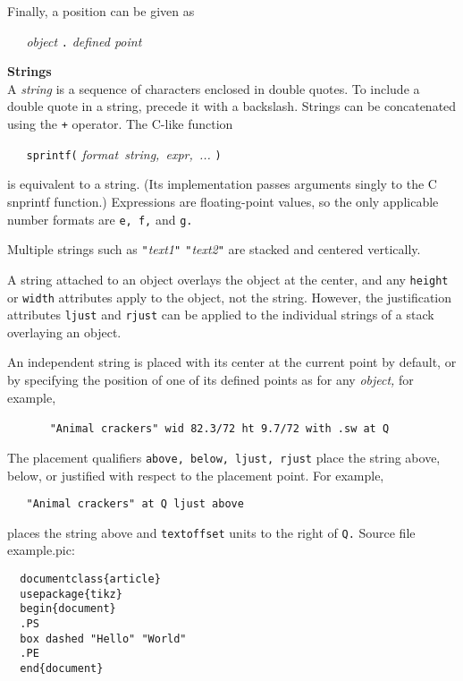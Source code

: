 Finally, a position can be given as

{\it \ \ \ object}
{\tt .}
{\it defined point}
\par\hskip-2pc{\bf Strings}\\
A
{\it string}
is a sequence of characters enclosed in double quotes.
To include a double quote in a string, precede it with a backslash. Strings
can be concatenated using the
{\tt +}
operator.
The C-like function

{\tt \ \ \ sprintf(}
{\it format\ string,\ expr,\ ...}
{\tt )}

is equivalent to a string.
(Its implementation passes arguments singly to the C snprintf function.)
Expressions are floating-point values, so the only applicable number
formats are
{\tt e,\ f,}
and
{\tt g.}

Multiple strings such as
{\it {\tt "}text1{\tt "} {\tt "}text2{\tt "}}
are stacked and centered vertically.

A string attached to an object overlays the object at the center, and
any
{\tt height}
or
{\tt width}
attributes apply to the object, not the string.
However, the justification attributes
{\tt ljust}
and
{\tt rjust}
can be applied to the individual strings of a stack overlaying
an object.

An independent string is placed with its center at the current point
by default, or by specifying the position of one of its defined points
as for any
{\it object,}
for example,

{\tt \ \ \ }
{\tt \ \ \ {\tt "}Animal\ crackers{\tt "}\ wid\ 82.3/72\ ht\ 9.7/72\ with\ .sw\ at\ Q}

The placement qualifiers
{\tt above,\ below,\ ljust,\ rjust}
place the string above, below, or justified with respect to the
placement point.
For example,

{\tt \ \ \ {\tt "}Animal\ crackers{\tt "}\ at\ Q\ ljust\ above}

places the string above and
{\tt textoffset}
units to the right of
{\tt Q.}
Source file example.pic:

{\tt \ \ {\tt {}}documentclass\{article\}}
\\\hbox{}\hskip-1pt
{\tt \ \ {\tt {}}usepackage\{tikz\}}
\\\hbox{}\hskip-1pt
{\tt \ \ {\tt {}}begin\{document\}}
\\\hbox{}\hskip-1pt
{\tt \ \ .PS}
\\\hbox{}\hskip-1pt
{\tt \ \ box\ dashed\ {\tt "}Hello{\tt "}\ {\tt "}World{\tt "}}
\\\hbox{}\hskip-1pt
{\tt \ \ .PE}
\\\hbox{}\hskip-1pt
{\tt \ \ {\tt {}}end\{document\}}

